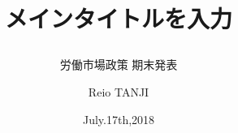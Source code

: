 \documentclass[dvipdfmx,14pt]{beamer}
\title{メインタイトルを入力
\subtitle{労働市場政策 期末発表}}
\author{Reio TANJI}
\date{July.17th,2018}
\institute{Osaka University}
\begin{document}
\begin{frame}\frametitle{}
\titlepage
\end{frame}
\end{document}
